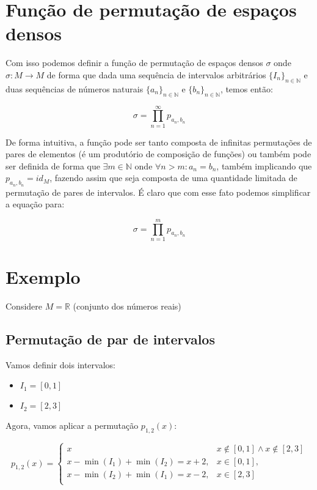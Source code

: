 \documentclass[12pt,a4paper]{article}
\begin{document}
\section{Função de permutação de espaços densos}

Com isso podemos definir a função de permutação de espaços densos $\sigma$ onde $\sigma: M \to M$ de forma que dada uma sequência de intervalos arbitrários $\{I_n\}_{n\in\mathbb{N}}$ e duas sequências de números naturais $\{a_n\}_{n\in\mathbb{N}}$ e $\{b_n\}_{n\in\mathbb{N}}$, temos então:

\begin{equation}
 \sigma = \prod_{n=1}^{\infty} p_{a_n,b_n}
\end{equation}

De forma intuitiva, a função pode ser tanto composta de infinitas permutações de pares de elementos (é um produtório de composição de funções) ou também pode ser definida de forma que $\exists m \in \mathbb{N}$ onde $\forall n > m : a_n=b_n$, também implicando que $p_{a_n,b_n}=id_M$, fazendo assim que seja composta de uma quantidade limitada de permutação de pares de intervalos. É claro que com esse fato podemos simplificar a equação para:

\begin{equation}
\sigma = \prod_{n=1}^{m} p_{a_n,b_n}
\end{equation}

\section{Exemplo}

Considere $M = \mathbb{R}$ (conjunto dos números reais)

\subsection{Permutação de par de intervalos}

Vamos definir dois intervalos:
\begin{itemize}
\item $I_1 = [0, 1]$
\item $I_2 = [2, 3]$
\end{itemize}

Agora, vamos aplicar a permutação $p_{1,2}(x)$:

\begin{equation}
p_{1,2}(x) = \begin{cases} 
    x & x \not\in [0, 1] \land x \not \in [2, 3]\\
    x - \min(I_1) + \min(I_2) = x + 2, & x \in [0, 1],\\
    x - \min(I_2) + \min(I_1) = x - 2, & x \in [2, 3]\\
\end{cases}
\end{equation}
\end{document}
